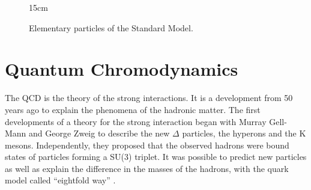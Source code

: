 \begin{figure}[!htm]{15cm}
\caption{Elementary particles of the Standard Model.}%
\label{fig:standard_model}
\end{figure}

\section{Quantum Chromodynamics}\label{sec:QCD}

The QCD is the theory of the strong interactions. It is a development from 50 years ago to explain the phenomena of the hadronic matter. The first developments of a theory for the strong interaction began with Murray Gell-Mann and George Zweig to describe the new $\Delta$ particles, the hyperons and the K mesons. Independently, they proposed that the observed hadrons were bound states of particles forming a SU(3) triplet. It was possible to predict new particles as well as explain the difference in the masses of the hadrons, with the quark model called ``eightfold way'' \cite{osti_4008239}.

